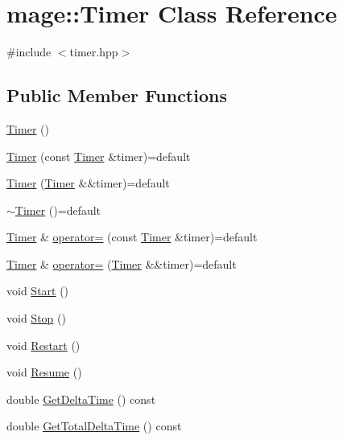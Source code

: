 \hypertarget{classmage_1_1_timer}{}\section{mage\+:\+:Timer Class Reference}
\label{classmage_1_1_timer}


{\ttfamily \#include $<$timer.\+hpp$>$}

\subsection*{Public Member Functions}
\begin{DoxyCompactItemize}
\item 
\hyperlink{classmage_1_1_timer_a5e1c0a3bb4491b3a43ce05874ad24055}{Timer} ()
\item 
\hyperlink{classmage_1_1_timer_a5a1e05fde40a44cd9434572712142c23}{Timer} (const \hyperlink{classmage_1_1_timer}{Timer} \&timer)=default
\item 
\hyperlink{classmage_1_1_timer_a5fb4b89725b16e0d4b1fbae2f95f30cb}{Timer} (\hyperlink{classmage_1_1_timer}{Timer} \&\&timer)=default
\item 
\hyperlink{classmage_1_1_timer_a66d6964a6d42eef72f7312f1233e4f74}{$\sim$\+Timer} ()=default
\item 
\hyperlink{classmage_1_1_timer}{Timer} \& \hyperlink{classmage_1_1_timer_ae83df63d5ff9eec370eddf208ac2077e}{operator=} (const \hyperlink{classmage_1_1_timer}{Timer} \&timer)=default
\item 
\hyperlink{classmage_1_1_timer}{Timer} \& \hyperlink{classmage_1_1_timer_a93f3a9d730bebd189af904568e5b7ecd}{operator=} (\hyperlink{classmage_1_1_timer}{Timer} \&\&timer)=default
\item 
void \hyperlink{classmage_1_1_timer_a5855c9df8ad1a2b6774942e566833647}{Start} ()
\item 
void \hyperlink{classmage_1_1_timer_abf234f1e2ee9e760f316bd49500d5a3a}{Stop} ()
\item 
void \hyperlink{classmage_1_1_timer_a4e1ba19d02c290a18981db1766f006c3}{Restart} ()
\item 
void \hyperlink{classmage_1_1_timer_a4d0e1c3bdeb93951c9332231be876d29}{Resume} ()
\item 
double \hyperlink{classmage_1_1_timer_a83508bc11ab27be8186532352ddd0376}{Get\+Delta\+Time} () const
\item 
double \hyperlink{classmage_1_1_timer_a4e304e66d8466e2f6fa04d3d95c92d10}{Get\+Total\+Delta\+Time} () const
\end{DoxyCompactItemize}

